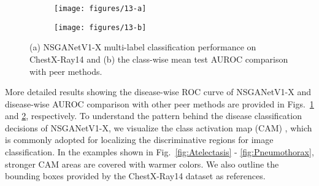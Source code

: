 \documentclass[journal]{IEEEtran}
\def\ourmethod{NSGANetV1}
\theoremstyle{definition}
\theoremstyle{remark}
\begin{document}
\begin{figure}[t]
	\centering
	\begin{subfigure}[t]{.24\textwidth}
		\centering
		\texttt{[image: figures/13-a]}
		\caption{\label{fig:nsganet_x_ray}}
	\end{subfigure} \hfill
	\begin{subfigure}[t]{.24\textwidth}
		\centering
		\texttt{[image: figures/13-b]}
		\caption{\label{fig:chexay14}}
	\end{subfigure}
	\caption{(a) \ourmethod{}-X multi-label classification performance on ChestX-Ray14 and (b) the class-wise mean test AUROC comparison with peer methods.
	\label{fig:nsganet_x}\vspace{-0.3cm}}
\end{figure}

More detailed results showing the disease-wise ROC curve of \ourmethod{}-X and disease-wise AUROC comparison with other peer methods are provided in Figs.~\ref{fig:nsganet_x_ray} and \ref{fig:chexay14}, respectively. To understand the pattern behind the disease classification decisions of \ourmethod{}-X, we visualize the class activation map (CAM) \cite{zhou2016learning}, which is commonly adopted for localizing the discriminative regions for image classification. In the examples shown in Fig.~\ref{fig:Atelectasis} - \ref{fig:Pneumothorax}, stronger CAM areas are covered with warmer colors. We also outline the bounding boxes provided by the ChestX-Ray14 dataset \cite{wang2017chestx} as references.
\end{document}
